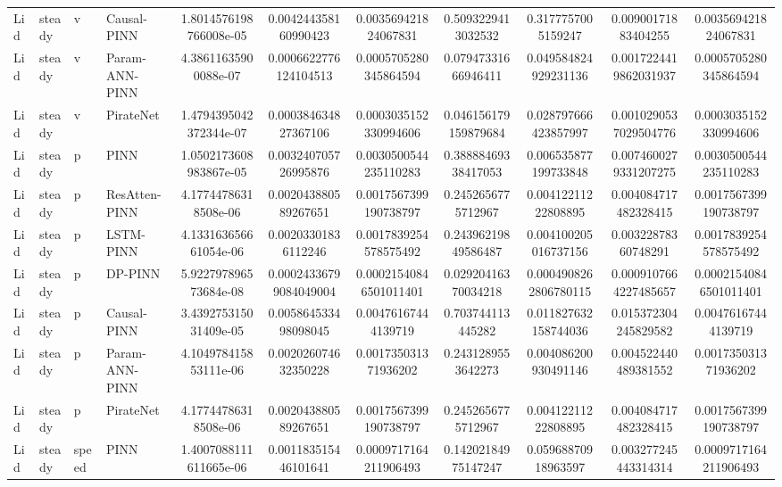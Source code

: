 \begin{landscape}
\begin{longtable}{llllccccccc}
 Lid & steady &     v &    Causal-PINN & 1.8014576198766008e-05 &   0.004244358160990423 &   0.003569421824067831 &   0.5093229413032532 &    0.3177757005159247 &   0.00900171883404255 &   0.003569421824067831 \\
 Lid & steady &     v & Param-ANN-PINN &   4.38611635900088e-07 &  0.0006622776124104513 &  0.0005705280345864594 &  0.07947331666946411 &  0.049584824929231136 & 0.0017224419862031937 &  0.0005705280345864594 \\
 Lid & steady &     v &      PirateNet & 1.4794395042372344e-07 &   0.000384634827367106 &  0.0003035152330994606 & 0.046156179159879684 &  0.028797666423857997 & 0.0010290537029504776 &  0.0003035152330994606 \\
 Lid & steady &     p &           PINN & 1.0502173608983867e-05 &   0.003240705726995876 &  0.0030500544235110283 &  0.38888469338417053 &  0.006535877199733848 & 0.0074600279331207275 &  0.0030500544235110283 \\
 Lid & steady &     p &  ResAtten-PINN &   4.17744786318508e-06 &   0.002043880589267651 &  0.0017567399190738797 &   0.2452656775712967 &   0.00412211222808895 &  0.004084717482328415 &  0.0017567399190738797 \\
 Lid & steady &     p &      LSTM-PINN &  4.133163656661054e-06 &    0.00203301836112246 &  0.0017839254578575492 &  0.24396219849586487 &  0.004100205016737156 &   0.00322878360748291 &  0.0017839254578575492 \\
 Lid & steady &     p &        DP-PINN &  5.922797896573684e-08 & 0.00024336799084049004 & 0.00021540846501011401 &  0.02920416370034218 & 0.0004908262806780115 & 0.0009107664227485657 & 0.00021540846501011401 \\
 Lid & steady &     p &    Causal-PINN &  3.439275315031409e-05 &   0.005864533498098045 &    0.00476167444139719 &    0.703744113445282 &  0.011827632158744036 &  0.015372304245829582 &    0.00476167444139719 \\
 Lid & steady &     p & Param-ANN-PINN &  4.104978415853111e-06 &   0.002026074632350228 &   0.001735031371936202 &   0.2431289553642273 &  0.004086200930491146 &  0.004522440489381552 &   0.001735031371936202 \\
 Lid & steady &     p &      PirateNet &   4.17744786318508e-06 &   0.002043880589267651 &  0.0017567399190738797 &   0.2452656775712967 &   0.00412211222808895 &  0.004084717482328415 &  0.0017567399190738797 \\
 Lid & steady & speed &           PINN & 1.4007088111611665e-06 &   0.001183515446101641 &  0.0009717164211906493 &  0.14202184975147247 &   0.05968870918963597 &  0.003277245443314314 &  0.0009717164211906493 \\

\end{longtable}
\end{landscape}
